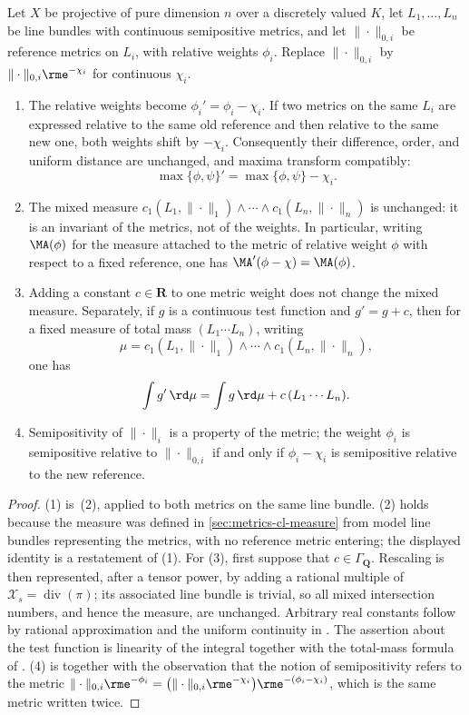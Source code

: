 \begin{proposition}
\label{prop:metrics-change-of-reference}
Let $X$ be projective of pure dimension $n$ over a discretely valued
$K$, let $L_1,\ldots,L_n$ be line bundles with continuous semipositive
metrics, and let $\|\cdot\|_{0,i}$ be reference metrics on $L_i$, with
relative weights $\phi_i$. Replace $\|\cdot\|_{0,i}$ by
$\|\cdot\|_{0,i}\rme^{-\chi_i}$ for continuous $\chi_i$.
\begin{enumerate}
\item The relative weights become $\phi_i'=\phi_i-\chi_i$. If two metrics
on the same $L_i$ are expressed relative to the same old reference and
then relative to the same new one, both weights shift by $-\chi_i$.
Consequently their difference, order, and uniform distance are unchanged,
and maxima transform compatibly:
\[
 \max\{\phi,\psi\}'=\max\{\phi,\psi\}-\chi_i.
\]
\item The mixed measure
$c_1(L_1,\|\cdot\|_1)\wedge\cdots\wedge c_1(L_n,\|\cdot\|_n)$ is
unchanged: it is an invariant of the metrics, not of the weights. In
particular, writing $\MA(\phi)$ for the measure attached to the metric of
relative weight $\phi$ with respect to a fixed reference, one has
$\MA'(\phi-\chi)=\MA(\phi)$.
\item Adding a constant $c\in\mathbf R$ to one metric weight does not
change the mixed measure. Separately, if $g$ is a continuous test function
and $g'=g+c$, then for a fixed measure of total mass
$(L_1\cdots L_n)$, writing
\[
 \mu=c_1(L_1,\|\cdot\|_1)\wedge\cdots\wedge
       c_1(L_n,\|\cdot\|_n),
\]
one has
\[
 \int g'\,\rd\mu=\int g\,\rd\mu+c\,(L_1\cdots L_n).
\]
\item Semipositivity of $\|\cdot\|_i$ is a property of the metric; the
weight $\phi_i$ is semipositive relative to $\|\cdot\|_{0,i}$ if and only
if $\phi_i-\chi_i$ is semipositive relative to the new reference.
\end{enumerate}
\end{proposition}

\begin{proof}
(1) is \,(2), applied to both metrics on the same
line bundle. (2) holds because the measure was
defined in \cref{sec:metrics-cl-measure} from model line bundles
representing the metrics, with no reference metric entering; the displayed
identity is a restatement of (1). For (3), first suppose that
$c\in\Gamma_{\mathbf Q}$. Rescaling is then represented, after a
tensor power, by adding a rational multiple of
$\mathcal X_s=\operatorname{div}(\pi)$; its associated line bundle is
trivial, so all mixed intersection numbers, and hence the measure, are
unchanged. Arbitrary real constants follow by rational approximation and
the uniform continuity in . The assertion
about the test function is linearity of the integral together with the
total-mass formula of
. (4) is
 together with the observation that the
notion of semipositivity refers to the metric $\|\cdot\|_{0,i}\rme^{-\phi_i}
=\bigl(\|\cdot\|_{0,i}\rme^{-\chi_i}\bigr)\rme^{-(\phi_i-\chi_i)}$, which is
the same metric written twice.
\end{proof}

